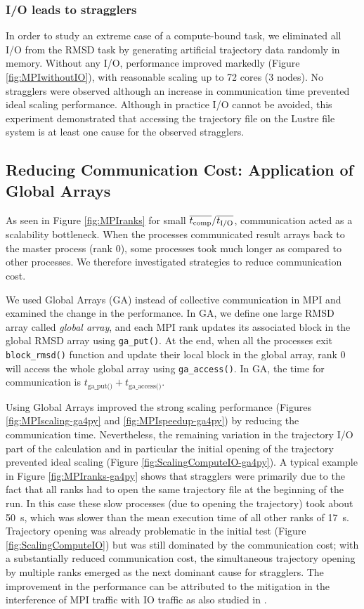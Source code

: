 \subsubsection{I/O leads to stragglers}

In order to study an extreme case of a compute-bound task, we eliminated all I/O from the RMSD task by generating artificial trajectory data randomly in memory.
Without any I/O, performance improved markedly (Figure \ref{fig:MPIwithoutIO}), with reasonable scaling up to 72 cores (3 nodes).
No stragglers were observed although an increase in communication time prevented ideal scaling performance.
Although in practice I/O cannot be avoided, this experiment demonstrated that accessing the trajectory file on the Lustre file system is at least one cause for the observed stragglers.

\subsection{Reducing Communication Cost: Application of Global Arrays}
\label{Global-Array}
As seen in Figure \ref{fig:MPIranks} for small $\overline{{t}_{\text{comp}}}/\overline{{t}_{\text{I/O}}}$, communication acted as a scalability bottleneck. 
When the processes communicated result arrays back to the master process (rank 0), some processes took much longer as compared to other processes. 
We therefore investigated strategies to reduce communication cost. 

We used Global Arrays (GA) \cite{GA, GAiN} instead of collective communication in MPI and examined the change in the performance. 
In GA, we define one large RMSD array called \emph{global array}, and each MPI rank updates its associated block in the global RMSD array using \texttt{ga\_put()}. 
At the end, when all the processes exit \texttt{block\_rmsd()} function and update their local block in the global array, rank 0 will access the whole global array using \texttt{ga\_access()}.
In GA, the time for communication is $t_{\text{ga\_put()}}+t_{\text{ga\_access()}}$. 

Using Global Arrays improved the strong scaling performance (Figures \ref{fig:MPIscaling-ga4py} and \ref{fig:MPIspeedup-ga4py}) by reducing the communication time.
Nevertheless, the remaining variation in the trajectory I/O part of the calculation and in particular the initial opening of the trajectory prevented ideal scaling (Figure \ref{fig:ScalingComputeIO-ga4py}).
A typical example in Figure \ref{fig:MPIranks-ga4py} shows that stragglers were primarily due to the fact that all ranks had to open the same trajectory file at the beginning of the run.
In this case these slow processes (due to opening the trajectory) took about 50~s, which was slower than the mean execution time of all other ranks of 17~s. 
Trajectory opening was already problematic in the initial test (Figure \ref{fig:ScalingComputeIO}) but was still dominated by the communication cost; with a substantially reduced communication cost, the simultaneous trajectory opening by multiple ranks emerged as the next dominant cause for stragglers.
The improvement in the performance can be attributed to the mitigation in the interference of MPI traffic with IO traffic as also studied in \cite{Brown:2018ab}.

